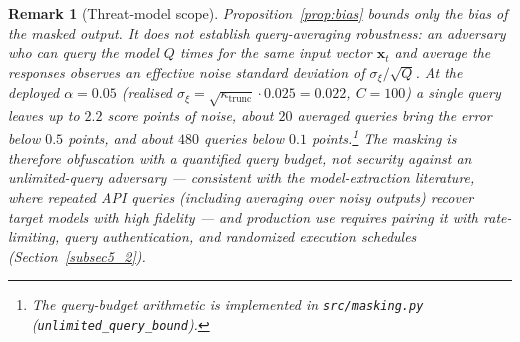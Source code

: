 \documentclass[pdflatex,sn-mathphys-num]{sn-jnl}
\theoremstyle{thmstyleone}
\theoremstyle{thmstyletwo}
\newtheorem{remark}{Remark}
\theoremstyle{thmstylethree}
\begin{document}
\begin{remark}[Threat-model scope]\label{rem:threat_model}
Proposition~\ref{prop:bias} bounds only the bias of the masked output. It does not establish query-averaging robustness: an adversary who can query the model $Q$ times for the same input vector $\mathbf{x}_t$ and average the responses observes an effective noise standard deviation of $\sigma_\xi / \sqrt{Q}$. At the deployed $\alpha = 0.05$ (realised $\sigma_\xi = \sqrt{\kappa_{\mathrm{trunc}}} \cdot 0.025 = 0.022$, $C = 100$) a single query leaves up to $2.2$ score points of noise, about $20$ averaged queries bring the error below $0.5$ points, and about $480$ queries below $0.1$ points.\footnote{The query-budget arithmetic is implemented in \texttt{src/masking.py} (\texttt{unlimited\_query\_bound}).} The masking is therefore \emph{obfuscation with a quantified query budget}, not security against an unlimited-query adversary --- consistent with the model-extraction literature, where repeated API queries (including averaging over noisy outputs) recover target models with high fidelity \cite{tramer2016} --- and production use requires pairing it with rate-limiting, query authentication, and randomized execution schedules (Section~\ref{subsec5_2}).
\end{remark}
\end{document}
